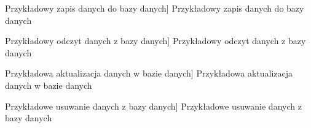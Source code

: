 \documentclass[../Kamil_Kowalewski_Main.tex]{subfiles}
\begin{document}
{{{            \begin{code}[H]
                
                \caption
                [Przykładowy zapis danych do bazy danych]
                {Przykładowy zapis danych do bazy danych}
                \label{chapter3:technologie:firebase:firestore:firestore_set_data}
            \end{code}

            \begin{code}[H]
                
                \caption
                [Przykładowy odczyt danych z bazy danych]
                {Przykładowy odczyt danych z bazy danych}
                \label{chapter3:technologie:firebase:firestore:firestore_get_data}
            \end{code}

            \begin{code}[H]
                
                \caption
                [Przykładowa aktualizacja danych w bazie danych]
                {Przykładowa aktualizacja danych w bazie danych}
                \label{chapter3:technologie:firebase:firestore:firestore_update_data}
            \end{code}

            \begin{code}[H]
                
                \caption
                [Przykładowe usuwanie danych z bazy danych]
                {Przykładowe usuwanie danych z bazy danych}
                \label{chapter3:technologie:firebase:firestore:firestore_delete_data}
            \end{code}
        }

}}
\end{document}
